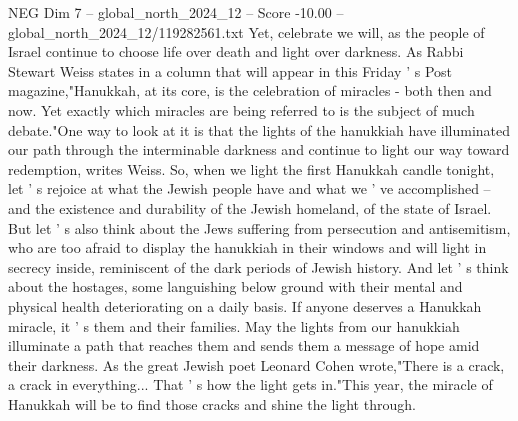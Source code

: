 \begin{textsample}{NEG Dim 7 – global\_north\_2024\_12 – Score -10.00 – global\_north\_2024\_12/119282561.txt}
Yet, celebrate we will, as the people of Israel continue to choose life over death and light over darkness.
As Rabbi Stewart Weiss states in a column that will appear in this Friday ' s Post magazine,"Hanukkah, at its core, is the celebration of miracles - both then and now.
Yet exactly which miracles are being referred to is the subject of much debate."One way to look at it is that the lights of the hanukkiah have illuminated our path through the interminable darkness and continue to light our way toward redemption, writes Weiss.
So, when we light the first Hanukkah candle tonight, let ' s rejoice at what the Jewish people have and what we ' ve accomplished -- and the existence and durability of the Jewish homeland, of the state of Israel.
But let ' s also think about the Jews suffering from persecution and antisemitism, who are too afraid to display the hanukkiah in their windows and will light in secrecy inside, reminiscent of the dark periods of Jewish history.
And let ' s think about the hostages, some languishing below ground with their mental and physical health deteriorating on a daily basis.
If anyone deserves a Hanukkah miracle, it ' s them and their families.
May the lights from our hanukkiah illuminate a path that reaches them and sends them a message of hope amid their darkness.
As the great Jewish poet Leonard Cohen wrote,"There is a crack, a crack in everything...
That ' s how the light gets in."This year, the miracle of Hanukkah will be to find those cracks and shine the light through.

\end{textsample}
